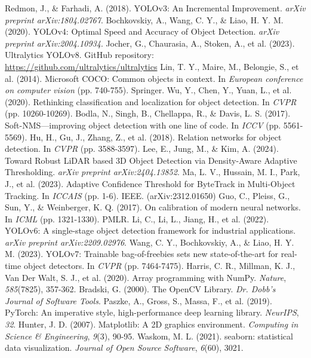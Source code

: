 \documentclass{article}
\begin{document}
\begin{thebibliography}{99}

 Redmon, J., \& Farhadi, A. (2018). YOLOv3: An Incremental Improvement. \textit{arXiv preprint arXiv:1804.02767}.
 Bochkovskiy, A., Wang, C. Y., \& Liao, H. Y. M. (2020). YOLOv4: Optimal Speed and Accuracy of Object Detection. \textit{arXiv preprint arXiv:2004.10934}.
 Jocher, G., Chaurasia, A., Stoken, A., et al. (2023). Ultralytics YOLOv8. GitHub repository: \url{https://github.com/ultralytics/ultralytics}
 Lin, T. Y., Maire, M., Belongie, S., et al. (2014). Microsoft COCO: Common objects in context. In \textit{European conference on computer vision} (pp. 740-755). Springer.
 Wu, Y., Chen, Y., Yuan, L., et al. (2020). Rethinking classification and localization for object detection. In \textit{CVPR} (pp. 10260-10269).
 Bodla, N., Singh, B., Chellappa, R., \& Davis, L. S. (2017). Soft-NMS—improving object detection with one line of code. In \textit{ICCV} (pp. 5561-5569).
 Hu, H., Gu, J., Zhang, Z., et al. (2018). Relation networks for object detection. In \textit{CVPR} (pp. 3588-3597).
 Lee, E., Jung, M., \& Kim, A. (2024). Toward Robust LiDAR based 3D Object Detection via Density-Aware Adaptive Thresholding. \textit{arXiv preprint arXiv:2404.13852}.
 Ma, L. V., Hussain, M. I., Park, J., et al. (2023). Adaptive Confidence Threshold for ByteTrack in Multi-Object Tracking. In \textit{ICCAIS} (pp. 1-6). IEEE. (arXiv:2312.01650)
 Guo, C., Pleiss, G., Sun, Y., \& Weinberger, K. Q. (2017). On calibration of modern neural networks. In \textit{ICML} (pp. 1321-1330). PMLR.
 Li, C., Li, L., Jiang, H., et al. (2022). YOLOv6: A single-stage object detection framework for industrial applications. \textit{arXiv preprint arXiv:2209.02976}.
 Wang, C. Y., Bochkovskiy, A., \& Liao, H. Y. M. (2023). YOLOv7: Trainable bag-of-freebies sets new state-of-the-art for real-time object detectors. In \textit{CVPR} (pp. 7464-7475).
 Harris, C. R., Millman, K. J., Van Der Walt, S. J., et al. (2020). Array programming with NumPy. \textit{Nature}, \textit{585}(7825), 357-362.
 Bradski, G. (2000). The OpenCV Library. \textit{Dr. Dobb's Journal of Software Tools}.
 Paszke, A., Gross, S., Massa, F., et al. (2019). PyTorch: An imperative style, high-performance deep learning library. \textit{NeurIPS}, \textit{32}.
 Hunter, J. D. (2007). Matplotlib: A 2D graphics environment. \textit{Computing in Science \& Engineering}, \textit{9}(3), 90-95.
 Waskom, M. L. (2021). seaborn: statistical data visualization. \textit{Journal of Open Source Software}, \textit{6}(60), 3021.

\end{thebibliography}
\end{document}
